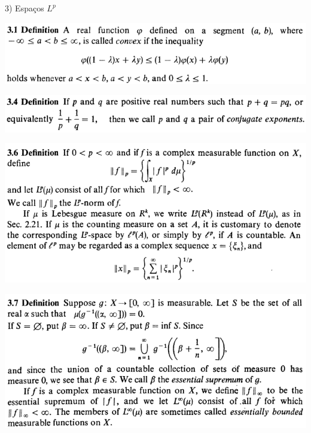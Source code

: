 \documentclass[12pt]{article}
\begin{document}
\vspace{3mm}

3) Espa\c{c}os $L^p$

\vspace{3mm}

		\begin{center}
		\includegraphics{d3ponto1}
		\end{center}

		\begin{center}
		\includegraphics{d3ponto4}
		\end{center}

		\begin{center}
		\includegraphics{d3ponto6}
		\end{center}

		\begin{center}
		\includegraphics{d3ponto7}
		\end{center}
\end{document}
